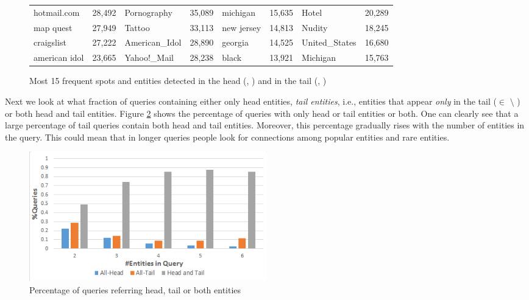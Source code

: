 \begin{figure}[t]
\begin{tabular}{lc|lc|lc|lc}
hotmail.com    & 28,492   &  Pornography       & 35,089   &  michigan    &   15,635  &   Hotel   		& 20,289 \\
map quest      & 27,949   &  Tattoo            & 33,113   &  new jersey  &   14,813  &   Nudity  		& 18,245 \\
craigslist     & 27,222   &  American\_Idol     & 28,890   &  georgia 	 &	14,525   &   United\_States   & 16,680 \\
american idol  & 23,665   &  Yahoo!\_Mail       & 28,238   &  black   	 &	13,921   &   Michigan        & 15,763 \\
\bottomrule
\end{tabular}
\label{tab:top-frequent}
\caption{Most 15 frequent spots and entities detected in the head (\shead{}, \ehead{}) and in the tail (\stail{}, \etail{})}
\end{figure}


Next we look at what fraction of queries containing either only head entities, \emph{tail entities}, i.e., entities 
that appear \emph{only} in the tail ($\in$ \etail{} $\setminus$ \ehead{})
or both head and tail entities. Figure \ref{img:headTailEntPercent} shows the percentage of 
queries with only head or tail entities or both. One can clearly see that a large percentage of tail 
queries contain both head and tail entities. Moreover, this percentage gradually rises with the 
number of entities in the query. This could mean that in longer queries people look
for connections among popular entities and rare entities. 

\begin{figure}
\label{img:headTailEntPercent}
  \centering
    \includegraphics[width = 0.5\textwidth]{images/entity-head-tail-count.png}
	
	\caption{Percentage of queries referring head, tail or both entities}
	
\end{figure}
 
